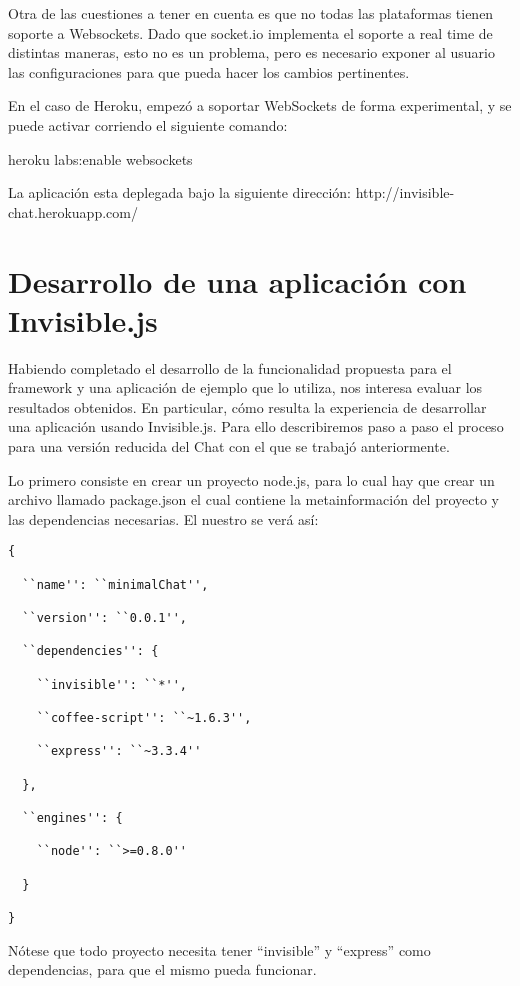 \documentclass[doc,helv,longtable]{article}
\begin{document}
Otra de las cuestiones a tener en cuenta es que no todas las plataformas tienen soporte a Websockets. Dado que socket.io implementa el soporte a real time de distintas maneras, esto no es un problema, pero es necesario exponer al usuario las configuraciones para que pueda hacer los cambios pertinentes.

En el caso de Heroku, empezó a soportar WebSockets de forma experimental, y se puede activar corriendo el siguiente comando:

heroku labs:enable websockets

La aplicación esta deplegada bajo la siguiente dirección: http://invisible-chat.herokuapp.com/

\section{Desarrollo de una aplicación con Invisible.js}


Habiendo completado el desarrollo de la funcionalidad propuesta para el framework y una aplicación de ejemplo que lo utiliza, nos interesa evaluar los resultados obtenidos. En particular, cómo resulta la experiencia de desarrollar una aplicación usando Invisible.js. Para ello describiremos paso a paso el proceso para una versión reducida del Chat con el que se trabajó anteriormente.

Lo primero consiste en crear un proyecto node.js, para lo cual hay que crear un archivo llamado package.json el cual contiene la metainformación del proyecto y las dependencias necesarias. El nuestro se verá así:

\begin{verbatim}
{

  ``name'': ``minimalChat'',

  ``version'': ``0.0.1'',

  ``dependencies'': {

    ``invisible'': ``*'',

    ``coffee-script'': ``~1.6.3'',

    ``express'': ``~3.3.4''

  },

  ``engines'': {

    ``node'': ``>=0.8.0''

  }

}
\end{verbatim}

Nótese que todo proyecto necesita tener “invisible” y “express” como dependencias, para que el mismo pueda funcionar.
\end{document}
